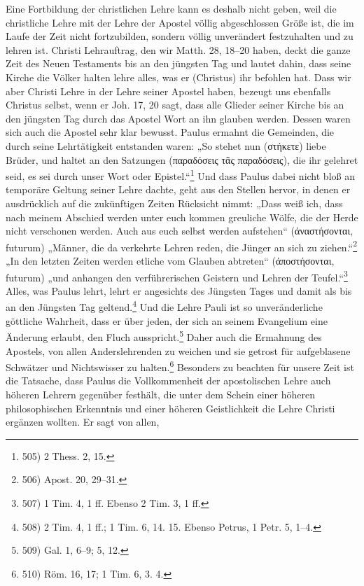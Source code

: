 Eine Fortbildung der christlichen Lehre kann es deshalb nicht geben, weil die christliche Lehre mit der Lehre der Apostel völlig abgeschlossen Größe ist, die im Laufe der Zeit nicht fortzubilden, sondern völlig unverändert festzuhalten und zu lehren ist. Christi Lehrauftrag, den wir Matth. 28, 18–20 haben, deckt die ganze Zeit des Neuen Testaments bis an den jüngsten Tag und lautet dahin, dass seine Kirche die Völker halten lehre alles, was er (Christus) ihr befohlen hat. Dass wir aber Christi Lehre in der Lehre seiner Apostel haben, bezeugt uns ebenfalls Christus selbst, wenn er Joh. 17, 20 sagt, dass alle Glieder seiner Kirche bis an den jüngsten Tag durch das Apostel Wort an ihn glauben werden. Dessen waren sich auch die Apostel sehr klar bewusst. Paulus ermahnt die Gemeinden, die durch seine Lehrtätigkeit entstanden waren: „So stehet nun (στήκετε) liebe Brüder, und haltet an den Satzungen (παραδόσεις τᾶς παραδόσεις), die ihr gelehret seid, es sei durch unser Wort oder Epistel.“\footnote{505) 2 Thess. 2, 15.} Und dass Paulus dabei nicht bloß an temporäre Geltung seiner Lehre dachte, geht aus den Stellen hervor, in denen er ausdrücklich auf die zukünftigen Zeiten Rücksicht nimmt: „Dass weiß ich, dass nach meinem Abschied werden unter euch kommen greuliche Wölfe, die der Herde nicht verschonen werden. Auch aus euch selbst werden aufstehen“ (ἀναστήσονται, futurum) „Männer, die da verkehrte Lehren reden, die Jünger an sich zu ziehen.“\footnote{506) Apost. 20, 29–31.} „In den letzten Zeiten werden etliche vom Glauben abtreten“ (ἀποστήσονται, futurum) „und anhangen den verführerischen Geistern und Lehren der Teufel.“\footnote{507) 1 Tim. 4, 1 ff. Ebenso 2 Tim. 3, 1 ff.} Alles, was Paulus lehrt, lehrt er angesichts des Jüngsten Tages und damit als bis an den Jüngsten Tag geltend.\footnote{508) 2 Tim. 4, 1 ff.; 1 Tim. 6, 14. 15. Ebenso Petrus, 1 Petr. 5, 1–4.} Und die Lehre Pauli ist so unveränderliche göttliche Wahrheit, dass er über jeden, der sich an seinem Evangelium eine Änderung erlaubt, den Fluch ausspricht.\footnote{509) Gal. 1, 6–9; 5, 12.} Daher auch die Ermahnung des Apostels, von allen Anderslehrenden zu weichen und sie getrost für aufgeblasene Schwätzer und Nichtswisser zu halten.\footnote{510) Röm. 16, 17; 1 Tim. 6, 3. 4.} Besonders zu beachten für unsere Zeit ist die Tatsache, dass Paulus die Vollkommenheit der apostolischen Lehre auch höheren Lehrern gegenüber festhält, die unter dem Schein einer höheren philosophischen Erkenntnis und einer höheren Geistlichkeit die Lehre Christi ergänzen wollten. Er sagt von allen,